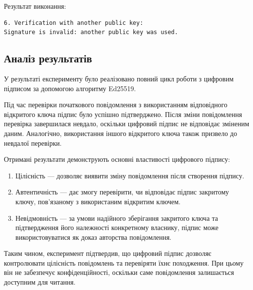 Результат виконання:

\begin{lstlisting}
6. Verification with another public key:
Signature is invalid: another public key was used.
\end{lstlisting}


\subsection{Аналіз результатів}

У результаті експерименту було реалізовано повний цикл роботи з цифровим підписом за допомогою алгоритму Ed25519.

Під час перевірки початкового повідомлення з використанням відповідного відкритого ключа підпис було успішно підтверджено. 
Після зміни повідомлення перевірка завершилася невдало, оскільки цифровий підпис не відповідає зміненим даним. 
Аналогічно, використання іншого відкритого ключа також призвело до невдалої перевірки.

Отримані результати демонструють основні властивості цифрового підпису:

\begin{enumerate}
    \item Цілісність — дозволяє виявити зміну повідомлення після створення підпису.
    \item Автентичність — дає змогу перевірити, чи відповідає підпис закритому ключу, по\-в'язаному з використаним відкритим ключем.
    \item Невідмовність — за умови надійного зберігання закритого ключа та підтвердження його належності конкретному власнику, 
    підпис може використовуватися як доказ авторства повідомлення.
\end{enumerate}

Таким чином, експеримент підтвердив, що цифровий підпис дозволяє контролювати цілісність повідомлень та перевіряти їхнє походження. 
При цьому він не забезпечує конфіденційності, оскільки саме повідомлення залишається доступним для читання.
